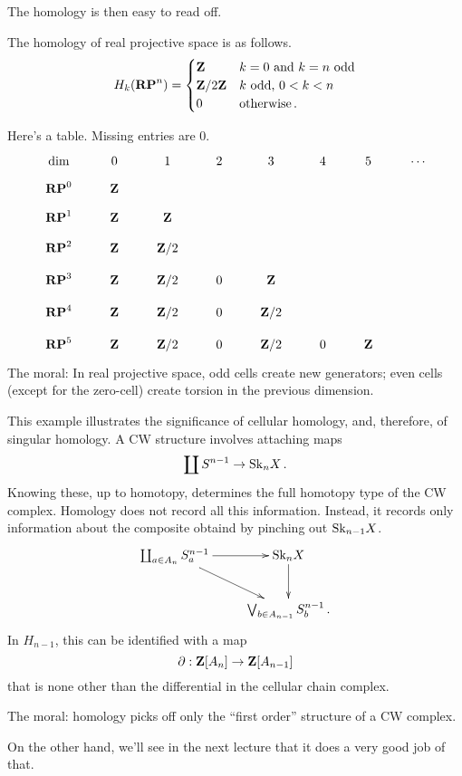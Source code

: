The homology is then easy to read off.
\begin{prop}
The homology of real projective space is as follows.
\begin{equation*}
 H_k(\mathbf{RP}^n)=\begin{cases}
\mathbf Z & k=0\text{ and }k=n\text{ odd}\\
\mathbf Z/2\mathbf Z & k\text{ odd, }0<k<n\\
0 & \text{otherwise}\,.
\end{cases}
\end{equation*}
\end{prop}
Here's a table. Missing entries are $0$.
\[
\xymatrix@R=8pt{
\text{dim} & 0 & 1 & 2 & 3 & 4 & 5 & \cdots \\
\RP^0 & \ZZ \\
\RP^1 & \ZZ & \ZZ \\
\RP^2 & \ZZ & \ZZ/2 \\
\RP^3 & \ZZ & \ZZ/2 & 0 & \ZZ \\
\RP^4 & \ZZ & \ZZ/2 & 0 & \ZZ/2 \\
\RP^5 & \ZZ & \ZZ/2 & 0 & \ZZ/2 & 0 & \ZZ 
}\]
The moral: In real projective space, 
odd cells create new generators; even cells (except for the zero-cell) create
torsion in the previous dimension. 

This example illustrates the significance of cellular homology, and, therefore,
of singular homology. A CW structure involves attaching maps 
\[
\coprod S^{n-1}\to\mathrm{Sk}_n X\,.
\]
Knowing these, up to homotopy, determines the full homotopy type of the CW 
complex. Homology does not record all this information. Instead, it records 
only information about the composite obtaind by pinching out $\mathrm{Sk}_{n-1}X$.
\[
\xymatrix{ 
\coprod_{a\in A_n} S^{n-1}_a \ar[r] \ar[dr] & \Sk_n X \ar[d] \\
& \bigvee_{b\in A_{n-1}} S^{n-1}_b\,.
}\]
In $H_{n-1}$, this can be identified with a map
\[
\partial:\mathbf Z[A_n]\to\mathbf Z[A_{n-1}]
\]
that is none other than the differential in the cellular chain complex.

The moral: homology picks off only the ``first order'' structure of a CW 
complex. 

On the other hand, we'll see in the next lecture that it does a very good job
of that. 


